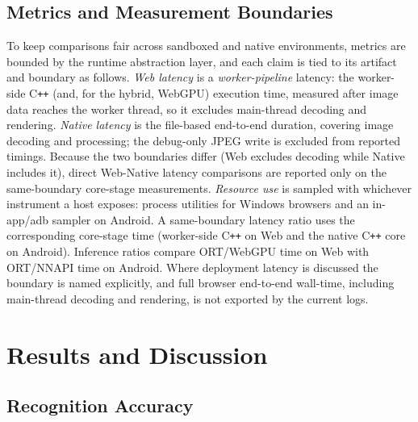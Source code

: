 \documentclass[conference]{IEEEtran}
\begin{document}
\subsection{Metrics and Measurement Boundaries}
To keep comparisons fair across sandboxed and native environments, metrics
are bounded by the runtime abstraction layer, and each claim is tied to its
artifact and boundary as follows. \emph{Web latency} is a
\emph{worker-pipeline} latency: the worker-side C\texttt{++} (and, for the
hybrid, WebGPU) execution time, measured after image data reaches the worker
thread, so it excludes main-thread decoding and rendering. \emph{Native latency} is the file-based end-to-end
duration, covering image decoding and processing; the debug-only JPEG write
is excluded from reported timings. Because the two boundaries differ (Web excludes decoding while Native includes it), direct Web-Native latency comparisons are reported only on the same-boundary core-stage measurements. \emph{Resource use} is sampled with whichever instrument a host exposes:
process utilities for Windows browsers and an in-app/adb
sampler on Android. A
same-boundary latency ratio uses the corresponding core-stage time (worker-side C\texttt{++} on Web and the native C\texttt{++} core on
Android). Inference ratios compare ORT/WebGPU time on Web with ORT/NNAPI
time on Android. Where deployment latency is discussed the boundary is named
explicitly, and full browser end-to-end wall-time, including main-thread
decoding and rendering, is not exported by the current logs.

\section{Results and Discussion}

\subsection{Recognition Accuracy}
\label{sec:results-recognition}
\end{document}
